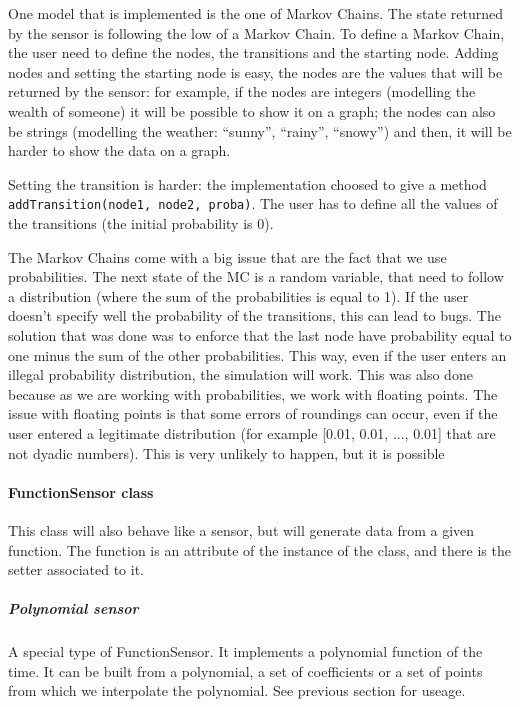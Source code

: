 One model that is implemented is the one of Markov Chains. The state returned
by the sensor is following the low of a Markov Chain. To define a Markov
Chain, the user need to define the nodes, the transitions and the starting
node. Adding nodes and setting the starting node is easy, the nodes are the
values that will be returned by the sensor: for example, if the nodes are
integers (modelling the wealth of someone) it will be possible to show it
on a graph; the nodes can also be strings (modelling the weather: ``sunny'',
``rainy'', ``snowy'') and then, it will be harder to show the data on a graph.

Setting the transition is harder: the implementation choosed to give a method
\verb!addTransition(node1, node2, proba)!. The user has to define all the
values of the transitions (the initial probability is 0).

The Markov Chains come with a big issue that are the fact that we use
probabilities. The next state of the MC is a random variable, that need to
follow a distribution (where the sum of the probabilities is equal to 1). If
the user doesn't specify well the probability of the transitions, this can lead
to bugs. The solution that was done was to enforce that the last node have
probability equal to one minus the sum of the other probabilities. This way,
even if the user enters an illegal probability distribution, the simulation
will work.
This was also done because as we are working with probabilities, we work
with floating points. The issue with floating points is that some errors of
roundings can occur, even if the user entered a legitimate distribution (for
example [0.01, 0.01, ..., 0.01] that are not dyadic numbers). This is very
unlikely to happen, but it is possible

\paragraph{FunctionSensor class}

This class will also behave like a sensor, but will generate data from a given
function. The function is an attribute of the instance of the class, and there
is the setter associated to it.

\subparagraph{Polynomial sensor}

A special type of FunctionSensor. It implements a polynomial function of
the time. It can be built from a polynomial, a set of coefficients or a set
of points from which we interpolate the polynomial. See previous section for
useage.

